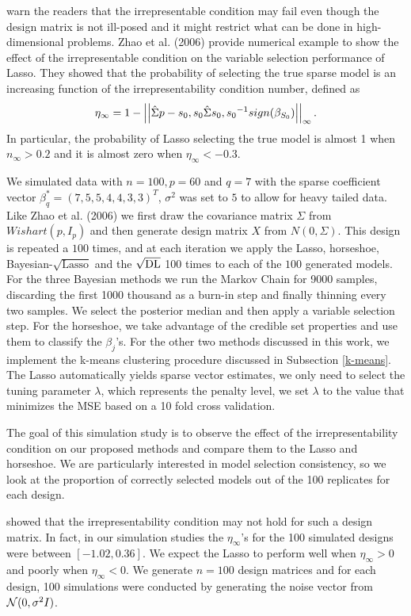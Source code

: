 \documentclass[10pt]{article}
\begin{document}
\citep{buhlmann2011statistics} warn the readers that the irrepresentable condition may fail even though the design matrix is not ill-posed and it might restrict what can be done in high-dimensional problems. Zhao et al. (2006) provide numerical example to show the effect of the irrepresentable condition on the variable selection performance of Lasso. They showed that the probability of selecting the true sparse model is an increasing function of the irrepresentability condition number, defined as $$ \eta_{\infty} = 1 - \left|\left| \hat{\Sigma}{p-s_0,s_0} \hat{\Sigma}{s_0,s_0}^{-1} sign(\beta_{S_0}) \right|\right|_{\infty} . $$ In particular, the probability of Lasso selecting the true model is almost 1 when $n_{\infty} > 0.2$ and it is almost zero when $\eta_{\infty} < -0.3$.

We simulated data with $n = 100, p = 60$ and $q = 7$ with the sparse coefficient vector $\beta_{q}^* = (7,5,5,4,4,3,3)^T$, $\sigma^2$ was set to $5$ to allow for heavy tailed data. Like Zhao et al. (2006) we first draw the covariance matrix $\Sigma$ from $Wishart(p, I_p)$ and then generate design matrix $X$ from $N(0,\Sigma)$. This design is repeated a $100$ times, and at each iteration we apply the Lasso, horseshoe, Bayesian-$\sqrt{\text{Lasso}}$ and the $\sqrt{\text{\rm{DL}}}$ 100 times to each of the $100$ generated models. For the three Bayesian methods we run the Markov Chain for 9000 samples, discarding the first 1000 thousand as a burn-in step and finally thinning every two samples. We select the posterior median and then apply a variable selection step. For the horseshoe, we take advantage of the credible set properties and use them to classify the $\beta_j$'s. For the other two methods discussed in this work, we implement the k-means clustering procedure discussed in Subsection \ref{k-means}. The Lasso automatically yields sparse vector estimates, we only need to select the tuning parameter $\lambda$, which represents the penalty level, we set $\lambda$ to the value that minimizes the MSE based on a 10 fold cross validation.

The goal of this simulation study is to observe the effect of the irrepresentability condition on our proposed methods and compare them to the Lasso and horseshoe. We are particularly interested in model selection consistency, so we look at the proportion of correctly selected models out of the 100 replicates for each design.

\citet{zhao2006model} showed that the irrepresentability condition may not hold for such a design matrix. In fact, in our simulation studies the $\eta_\infty$'s for the 100 simulated designs were between $[-1.02, 0.36]$. We expect the Lasso to perform well when $\eta_\infty>0$ and poorly when $\eta_\infty<0$. We generate $n = 100$ design matrices and for each design, 100 simulations were conducted by generating the noise vector from $\mathcal{N}(0, \sigma^2 I)$.
\end{document}
